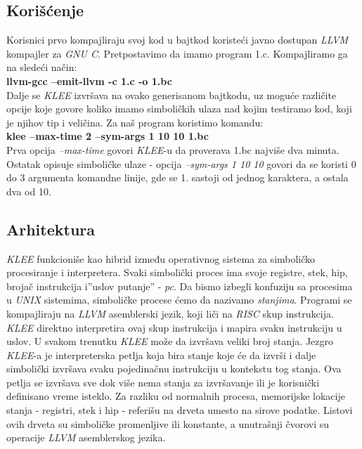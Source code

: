 \documentclass[a4paper]{article}
\begin{document}
{\subsection{Korišćenje}
\label{subsec:podnaslovK}
Korisnici prvo kompajliraju svoj kod u bajtkod koristeći javno dostupan \textit{LLVM} kompajler za \textit{GNU C}. Pretpostavimo da imamo program 1.c. Kompajliramo ga na sledeći način: \\
\textbf{llvm-gcc --emit-llvm -c 1.c -o 1.bc}\\
Dalje se \textit{KLEE} izvršava na ovako generisanom bajtkodu, uz moguće različite opcije koje govore koliko imamo simboličkih ulaza nad kojim testiramo kod, koji je njihov tip i veličina. Za naš program koristimo komandu: \\
\textbf{klee --max-time 2 --sym-args 1 10 10 1.bc}\\
Prva opcija \textit{--max-time} govori \textit{KLEE}-u da proverava 1.bc najviše dva minuta. Ostatak opisuje simboličke ulaze - opcija \textit{--sym-args 1 10 10}
govori da se koristi 0  do 3 argumenta komandne linije, gde se 1. sastoji od jednog  karaktera, a ostala dva od 10. 

\subsection{Arhitektura}
\label{subsec:podnaslovK}
\textit{KLEE} funkcioniše kao hibrid između operativnog sistema za simboličko procesiranje i interpretera. Svaki simbolički proces ima svoje registre, stek, hip, brojač instrukcija i''uslov putanje'' - \textit{pc}. Da bismo izbegli konfuziju sa procesima u \textit{UNIX} sistemima, simboličke procese ćemo da nazivamo \textit{stanjima}. Programi se kompajliraju na \textit{LLVM} asemblerski jezik, koji liči na \textit{RISC}  skup instrukcija. \textit{KLEE} direktno interpretira ovaj skup instrukcija i mapira svaku instrukciju u uslov. U svakom trenutku \textit{KLEE} može da izvršava veliki broj stanja. Jezgro \textit{KLEE}-a je interpreterska petlja koja bira stanje koje će da izvrši i dalje simbolički izvršava svaku pojedinačnu instrukciju u kontekstu tog stanja. Ova petlja se izvršava sve dok više nema stanja za izvršavanje ili je korisnički definisano vreme isteklo. Za razliku od normalnih procesa, memorijske lokacije stanja - registri, stek i hip -  referišu na drveta umesto na sirove podatke. Listovi ovih drveta su simboličke promenljive ili konstante, a unutrašnji čvorovi su operacije \textit{LLVM} asemblerskog jezika. 

}
\end{document}
